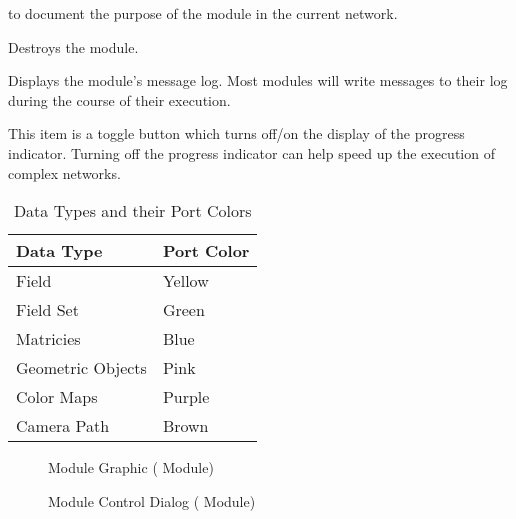 \begin{description}
\begin{description}
    to document the purpose of the module in the current network.
  \item[\menuitem{Destroy}] Destroys the module.
  \item[\menuitem{Show Log}] Displays the module's message log.  Most modules will
    write messages to their log during the course of their execution.
  \item[\menuitem{Show Status}] This item is a toggle button which turns off/on the
    display of the progress indicator.  Turning off the progress indicator
    can help speed up the execution of complex networks.
  \end{description}
\end{description}

\begin{table}[htbp]
  \begin{center}
    \begin{tabular}{|l|l|}
      \hline
      \textbf{Data Type} & \textbf{Port Color} \\
      \hline
      Field & Yellow \\
      Field Set & Green \\
      Matricies & Blue \\
      Geometric Objects & Pink \\
      Color Maps & Purple \\
      Camera Path & Brown \\
      \hline
    \end{tabular}
    \caption{Data Types and their Port Colors}
    \label{tab:portcolors}
  \end{center}
\end{table}


\begin{figure}[htb]
  \begin{makeimage}
  \end{makeimage}
  \modgraphic
  \caption{\label{fig:modgraphic} Module Graphic ( Module)}
\end{figure}

\begin{figure}[htb]
  \begin{makeimage}
  \end{makeimage}
  \moddialog
  \caption{\label{fig:moddialog} Module Control Dialog ( Module)}
\end{figure}

